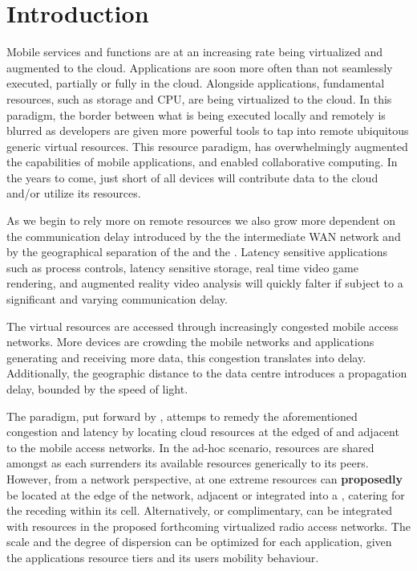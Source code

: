 \section{Introduction}
Mobile services and \ue{} functions are at an increasing rate being virtualized and augmented to the cloud. Applications are soon more often than not seamlessly executed, partially or fully in the cloud. Alongside applications, fundamental \ue{} resources, such as storage and CPU, are being virtualized to the cloud. In this paradigm, the border between what is being executed locally and remotely is blurred as developers are given more powerful tools to tap into remote ubiquitous generic virtual resources. This resource paradigm, has overwhelmingly augmented the capabilities of mobile applications, and enabled collaborative computing. In the years to come, just short of all devices will contribute data to the cloud and/or utilize its resources.

As we begin to rely more on remote resources we also grow more dependent on the communication delay introduced by the the intermediate WAN network and by the geographical separation of the \ue{} and the \dc{}. Latency sensitive applications such as process controls, latency sensitive storage, real time video game rendering, and augmented reality video analysis will quickly falter if subject to a significant and varying communication delay.

The virtual resources are accessed through increasingly congested mobile access networks. More devices are crowding the mobile networks and applications generating and receiving more data, this congestion translates into delay. Additionally, the geographic distance to the data centre introduces a propagation delay, bounded by the speed of light.

The \xcloud{} paradigm, put forward by \cite{chandra2013decentralized,ericsson_akami}, attemps to remedy the aforementioned congestion and latency by locating cloud resources at the edged of and adjacent to the mobile access networks. In the ad-hoc scenario, resources are shared amongst \ues{} as each \ue surrenders its available resources generically to its peers. However, from a network perspective, at one extreme \dc{} resources can \textbf{proposedly} be located at the edge of the network, adjacent or integrated into a \rbs{}, catering for the \ues{} receding within its cell. Alternatively, or complimentary, \dcs{} can be integrated with resources in the proposed forthcoming virtualized radio access networks. The scale and the degree of dispersion can be optimized for each application, given the applications resource tiers and its users mobility behaviour.


